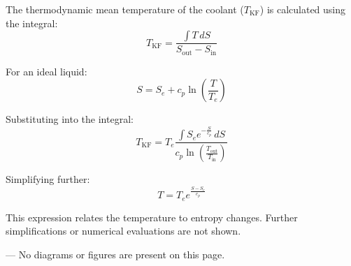 The thermodynamic mean temperature of the coolant (\( T_{\text{KF}} \)) is calculated using the integral:  
\[
T_{\text{KF}} = \frac{\int T \, dS}{S_{\text{out}} - S_{\text{in}}}
\]  

For an ideal liquid:  
\[
S = S_e + c_p \ln \left( \frac{T}{T_e} \right)
\]  

Substituting into the integral:  
\[
T_{\text{KF}} = T_e \frac{\int S_e e^{-\frac{S}{c_p}} \, dS}{c_p \ln \left( \frac{T_{\text{out}}}{T_{\text{in}}} \right)}
\]  

Simplifying further:  
\[
T = T_e e^{\frac{S - S_e}{c_p}}
\]  

This expression relates the temperature to entropy changes. Further simplifications or numerical evaluations are not shown.  

---  
No diagrams or figures are present on this page.